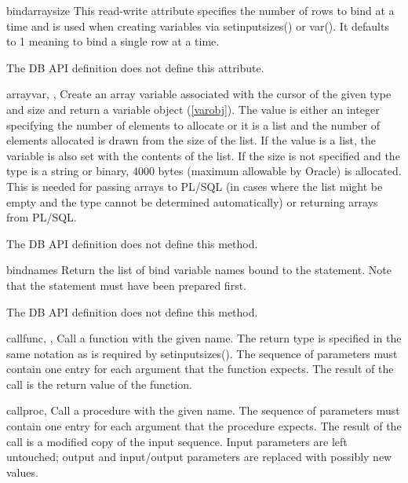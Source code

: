 \documentclass{manual}
\begin{document}
\begin{datadesc}{bindarraysize}
  This read-write attribute specifies the number of rows to bind at a time and
  is used when creating variables via setinputsizes() or var(). It defaults to
  1 meaning to bind a single row at a time.

   The DB API definition does not define this attribute.
\end{datadesc}

\begin{funcdesc}{arrayvar}{, , }
  Create an array variable associated with the cursor of the given type and
  size and return a variable object (\ref{varobj}). The value is either an
  integer specifying the number of elements to allocate or it is a list and
  the number of elements allocated is drawn from the size of the list. If the
  value is a list, the variable is also set with the contents of the list. If
  the size is not specified and the type is a string or binary, 4000 bytes
  (maximum allowable by Oracle) is allocated. This is needed for passing arrays
  to PL/SQL (in cases where the list might be empty and the type cannot be
  determined automatically) or returning arrays from PL/SQL.

   The DB API definition does not define this method.
\end{funcdesc}

\begin{funcdesc}{bindnames}{}
  Return the list of bind variable names bound to the statement. Note that the
  statement must have been prepared first.

   The DB API definition does not define this method.
\end{funcdesc}

\begin{funcdesc}{callfunc}{, ,
      }
  Call a function with the given name. The return type is specified in the
  same notation as is required by setinputsizes(). The sequence of parameters
  must contain one entry for each argument that the function expects.
  The result of the call is the return value of the function.
\end{funcdesc}

\begin{funcdesc}{callproc}{, }
  Call a procedure with the given name. The sequence of parameters must contain
  one entry for each argument that the procedure expects. The result of the
  call is a modified copy of the input sequence. Input parameters are left
  untouched; output and input/output parameters are replaced with possibly new
  values.
\end{funcdesc}
\end{document}
